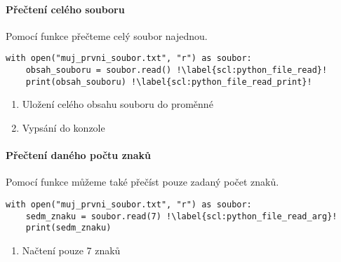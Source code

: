 \paragraph{Přečtení celého souboru}
Pomocí funkce  přečteme celý soubor najednou.

\begin{minipage}[t]{.45\textwidth}
\begin{code}
\begin{verbatim}
with open("muj_prvni_soubor.txt", "r") as soubor: 
	obsah_souboru = soubor.read() !\label{scl:python_file_read}!
	print(obsah_souboru) !\label{scl:python_file_read_print}!
\end{verbatim}

\label{code:python_file_read}
\end{code}
\end{minipage}
\begin{minipage}[t]{.45\textwidth}
\begin{enumerate}
\vspace{0.5cm}
\item[ř. \ref{scl:python_file_read}:] Uložení celého obsahu souboru do proměnné 
\item[ř. \ref{scl:python_file_read_print}:] Vypsání do konzole 
\end{enumerate}
\end{minipage}

\paragraph{Přečtení daného počtu znaků}
Pomocí funkce  můžeme také přečíst pouze zadaný počet znaků.

\begin{minipage}[t]{.45\textwidth}
\begin{code}
\begin{verbatim}
with open("muj_prvni_soubor.txt", "r") as soubor: 
	sedm_znaku = soubor.read(7) !\label{scl:python_file_read_arg}!
	print(sedm_znaku)
\end{verbatim}

\label{code:python_file_read_arg}
\end{code}
\end{minipage}
\begin{minipage}[t]{.45\textwidth}
\begin{enumerate}
\vspace{0.5cm}
\item[ř. \ref{scl:python_file_read_arg}:] Načtení pouze 7 znaků
\end{enumerate}
\end{minipage}


